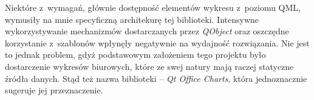 Niektóre z~wymagań, głównie dostępność elementów wykresu z~poziomu QML, wymusiły na mnie specyficzną architekurę tej biblioteki. Intensywne wykorzystywanie mechanizmów dostarczanych przez \textit{QObject} oraz oszczędne korzystanie z~szablonów wpłynęły negatywnie na wydajność rozwiązania. Nie jest to jednak problem, gdyż podstawowym założeniem tego projektu było dostarczenie wykresów biurowych, które ze swej natury mają raczej statyczne źródła danych. Stąd też nazwa biblioteki -- \textit{Qt Office Charts}, która jednoznacznie sugeruje jej przeznaczenie. 
















